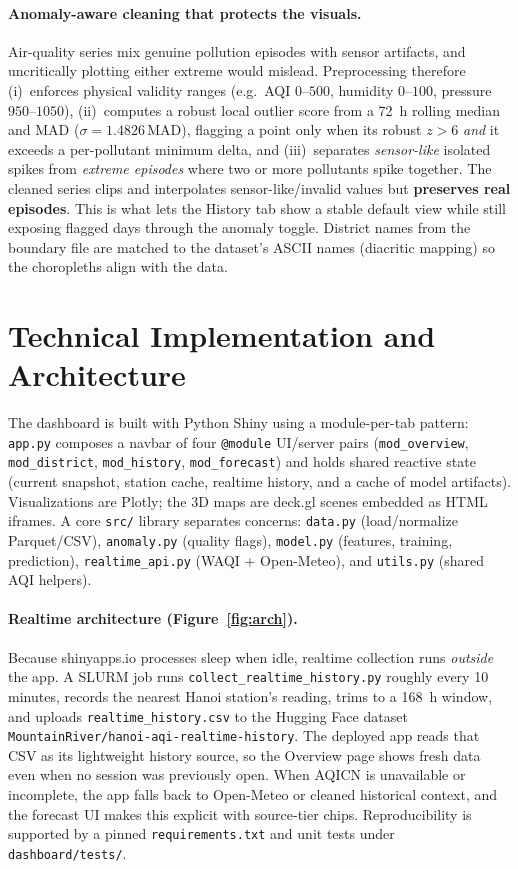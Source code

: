 \documentclass[a4paper]{article}
\begin{document}
\paragraph{Anomaly-aware cleaning that protects the visuals.}
Air-quality series mix genuine pollution episodes with sensor artifacts, and uncritically plotting either
extreme would mislead. Preprocessing therefore (i)~enforces physical validity ranges (e.g.\ AQI
$0$--$500$, humidity $0$--$100$, pressure $950$--$1050$), (ii)~computes a robust local outlier score from a
72~h rolling median and MAD ($\sigma = 1.4826\,\text{MAD}$), flagging a point only when its robust
$z>6$ \emph{and} it exceeds a per-pollutant minimum delta, and (iii)~separates \emph{sensor-like} isolated
spikes from \emph{extreme episodes} where two or more pollutants spike together. The cleaned series clips
and interpolates sensor-like/invalid values but \textbf{preserves real episodes}. This is what lets the
History tab show a stable default view while still exposing flagged days through the anomaly toggle.
District names from the boundary file are matched to the dataset's ASCII names (diacritic mapping) so the
choropleths align with the data.

\section{Technical Implementation and Architecture}
The dashboard is built with Python Shiny using a module-per-tab pattern: \texttt{app.py} composes a navbar
of four \texttt{@module} UI/server pairs (\texttt{mod\_overview}, \texttt{mod\_district},
\texttt{mod\_history}, \texttt{mod\_forecast}) and holds shared reactive state (current snapshot, station
cache, realtime history, and a cache of model artifacts). Visualizations are Plotly; the 3D maps are
deck.gl scenes embedded as HTML iframes. A core \texttt{src/} library separates concerns: \texttt{data.py}
(load/normalize Parquet/CSV), \texttt{anomaly.py} (quality flags), \texttt{model.py} (features, training,
prediction), \texttt{realtime\_api.py} (WAQI + Open-Meteo), and \texttt{utils.py} (shared AQI helpers).

\paragraph{Realtime architecture (Figure~\ref{fig:arch}).}
Because shinyapps.io processes sleep when idle, realtime collection runs \emph{outside} the app. A SLURM
job runs \texttt{collect\_realtime\_history.py} roughly every 10 minutes, records the nearest Hanoi
station's reading, trims to a 168~h window, and uploads \texttt{realtime\_history.csv} to the Hugging Face
dataset \texttt{MountainRiver/hanoi-aqi-realtime-history}. The deployed app reads that CSV as its
lightweight history source, so the Overview page shows fresh data even when no session was previously open.
When AQICN is unavailable or incomplete, the app falls back to Open-Meteo or cleaned historical context,
and the forecast UI makes this explicit with source-tier chips. Reproducibility is supported by a pinned
\texttt{requirements.txt} and unit tests under \texttt{dashboard/tests/}.
\end{document}
